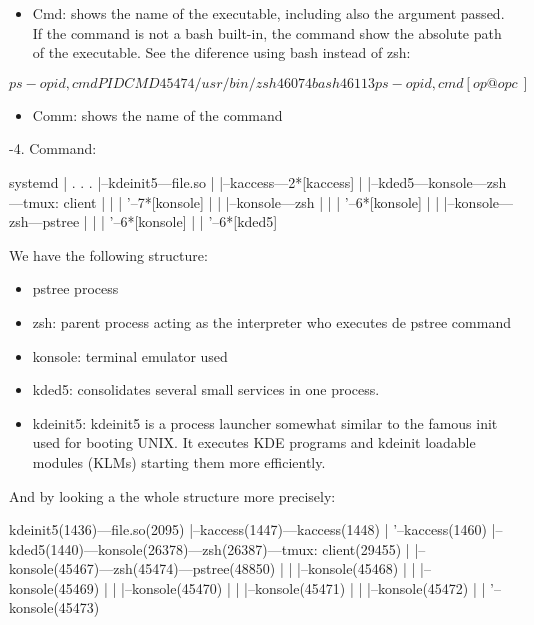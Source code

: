 \documentclass[a4paper]{article}
\begin{document}
\begin{itemize}
\item 
Cmd: shows the name of the executable, including also the argument passed. If the command is not a bash built{-\allowbreak}in, the command show the absolute path of the executable. See the diference using bash instead of zsh:
\end{itemize}

\begin{plain}
[op@opc ~]$ ps -o pid,cmd
    PID CMD
  45474 /usr/bin/zsh
  46074 bash
  46113 ps -o pid,cmd
[op@opc ~]$ 
\end{plain}

\begin{itemize}
\item 
Comm: shows the name of the command
\end{itemize}

{-\allowbreak}4.  Command:

\begin{plain}
systemd
|
.
.
.
|--kdeinit5---file.so
|          |--kaccess---2*[{kaccess}]
|          |--kded5---konsole---zsh---tmux: client
|          |       |         '--7*[{konsole}]
|          |       |--konsole---zsh
|          |       |         '--6*[{konsole}]
|          |       |--konsole---zsh---pstree
|          |       |         '--6*[{konsole}]
|          |       '--6*[{kded5}]

\end{plain}

We have the following structure:

\begin{itemize}
\item 
pstree process
\item 
zsh: parent process acting as the interpreter who executes de pstree command
\item 
konsole: terminal emulator used
\item 
kded5: consolidates several small services in one process.
\item 
kdeinit5: kdeinit5 is a process launcher somewhat similar to the famous init used for booting UNIX. It executes KDE programs and kdeinit loadable modules (KLMs) starting them more efficiently.
\end{itemize}

And by looking a the whole structure more precisely:

\begin{plain}
kdeinit5(1436)---file.so(2095)
               |--kaccess(1447)---{kaccess}(1448)
               |               '--{kaccess}(1460)
               |--kded5(1440)---konsole(26378)---zsh(26387)---tmux: client(29455)
               |             |--konsole(45467)---zsh(45474)---pstree(48850)
               |             |                |--{konsole}(45468)
               |             |                |--{konsole}(45469)
               |             |                |--{konsole}(45470)
               |             |                |--{konsole}(45471)
               |             |                |--{konsole}(45472)
               |             |                '--{konsole}(45473)
\end{plain}
\end{document}
